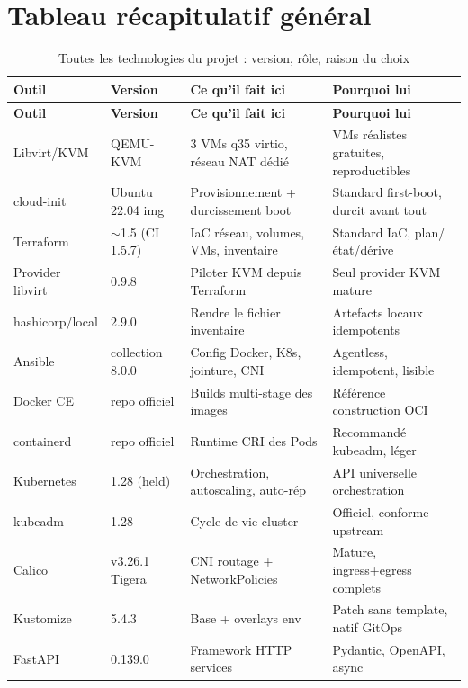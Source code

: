 \documentclass[12pt,a4paper,twoside,openright]{report}
\begin{document}
\section{Tableau récapitulatif général}\label{sec:recap}

{\footnotesize
\begin{longtable}{@{}p{3.0cm}p{1.9cm}p{4.7cm}p{4.7cm}@{}}
\caption{Toutes les technologies du projet : version, rôle, raison du choix}\\
\toprule
\textbf{Outil} & \textbf{Version} & \textbf{Ce qu'il fait ici} & \textbf{Pourquoi lui} \\
\midrule
\endfirsthead
\toprule
\textbf{Outil} & \textbf{Version} & \textbf{Ce qu'il fait ici} & \textbf{Pourquoi lui} \\
\midrule
\endhead
Libvirt/KVM & QEMU-KVM & 3 VMs q35 virtio, réseau NAT dédié & VMs réalistes gratuites, reproductibles \\
cloud-init & Ubuntu 22.04 img & Provisionnement + durcissement boot & Standard first-boot, durcit avant tout \\
Terraform & $\sim$1.5 (CI 1.5.7) & IaC réseau, volumes, VMs, inventaire & Standard IaC, plan/état/dérive \\
Provider libvirt & 0.9.8 & Piloter KVM depuis Terraform & Seul provider KVM mature \\
hashicorp/local & 2.9.0 & Rendre le fichier inventaire & Artefacts locaux idempotents \\
Ansible & collection 8.0.0 & Config Docker, K8s, jointure, CNI & Agentless, idempotent, lisible \\
Docker CE & repo officiel & Builds multi-stage des images & Référence construction OCI \\
containerd & repo officiel & Runtime CRI des Pods & Recommandé kubeadm, léger \\
Kubernetes & 1.28 (held) & Orchestration, autoscaling, auto-rép & API universelle orchestration \\
kubeadm & 1.28 & Cycle de vie cluster & Officiel, conforme upstream \\
Calico & v3.26.1 Tigera & CNI routage + NetworkPolicies & Mature, ingress+egress complets \\
Kustomize & 5.4.3 & Base + overlays env & Patch sans template, natif GitOps \\
FastAPI & 0.139.0 & Framework HTTP services & Pydantic, OpenAPI, async \\

\end{longtable}}
\end{document}
